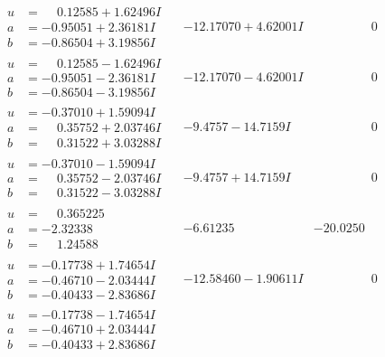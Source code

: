 \documentclass[1p]{elsarticle_modified}
\theoremstyle{definition}
\begin{document}
$$\begin{array}{c|c|c}
 \hline 
\begin{aligned}
u &= \phantom{-}0.12585 + 1.62496 I \\
a &= -0.95051 + 2.36181 I \\
b &= -0.86504 + 3.19856 I\end{aligned}
 & -12.17070 + 4.62001 I & \phantom{-0.000000 } 0 \\ \hline\begin{aligned}
u &= \phantom{-}0.12585 - 1.62496 I \\
a &= -0.95051 - 2.36181 I \\
b &= -0.86504 - 3.19856 I\end{aligned}
 & -12.17070 - 4.62001 I & \phantom{-0.000000 } 0 \\ \hline\begin{aligned}
u &= -0.37010 + 1.59094 I \\
a &= \phantom{-}0.35752 + 2.03746 I \\
b &= \phantom{-}0.31522 + 3.03288 I\end{aligned}
 & -9.4757 - 14.7159 I & \phantom{-0.000000 } 0 \\ \hline\begin{aligned}
u &= -0.37010 - 1.59094 I \\
a &= \phantom{-}0.35752 - 2.03746 I \\
b &= \phantom{-}0.31522 - 3.03288 I\end{aligned}
 & -9.4757 + 14.7159 I & \phantom{-0.000000 } 0 \\ \hline\begin{aligned}
u &= \phantom{-}0.365225\phantom{ +0.000000I} \\
a &= -2.32338\phantom{ +0.000000I} \\
b &= \phantom{-}1.24588\phantom{ +0.000000I}\end{aligned}
 & -6.61235\phantom{ +0.000000I} & -20.0250\phantom{ +0.000000I} \\ \hline\begin{aligned}
u &= -0.17738 + 1.74654 I \\
a &= -0.46710 - 2.03444 I \\
b &= -0.40433 - 2.83686 I\end{aligned}
 & -12.58460 - 1.90611 I & \phantom{-0.000000 } 0 \\ \hline\begin{aligned}
u &= -0.17738 - 1.74654 I \\
a &= -0.46710 + 2.03444 I \\
b &= -0.40433 + 2.83686 I\end{aligned}

\end{array}$$
\end{document}
